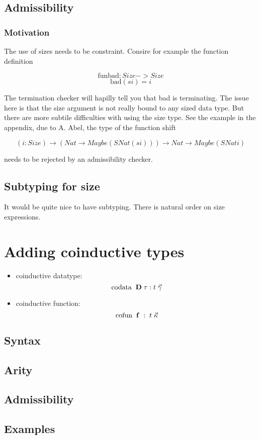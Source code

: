 \section{Admissibility}
\subsection{Motivation}
The use of sizes needs to be constraint.
Consire for example the function definition

\[ \mathrm{fun} \mathrm{bad} : Size -> Size \]
\[ \mathrm{bad} (s i) = i \]

The termination checker will hapilly tell you that bad is terminating.
The issue here is that the size argument is not really bound to any sized data type.
But there are more subtile difficulties with using the size type.
See the example in the appendix, due to A. Abel,
the type of the function shift

\[ (i : Size) \rightarrow (Nat \rightarrow Maybe (SNat (s i))) \rightarrow Nat \rightarrow Maybe (SNat i) \] 

needs to be rejected by an admissibility checker.


\section{Subtyping for size}
It would be quite nice to have subtyping.
There is natural order on size expressions.


\chapter{Adding coinductive types}

\begin{itemize}
\item
coinductive datatype:
\[\mathrm{codata}\; \; \mathbf{D} \; \tau : t \; \vec{\gamma}\]  

\item
coinductive function:
\[\mathrm{cofun}\; \; \mathbf{f} \; : \; t \; \vec{\kappa}\]
\end{itemize}

\section{Syntax}

\section{Arity}

\section{Admissibility}

\section{Examples}


